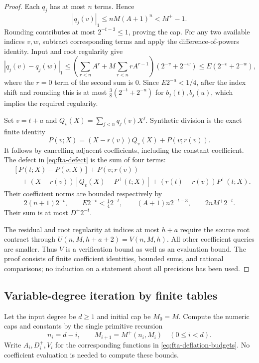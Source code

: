 \begin{proof}
Each $q_j$ has at most $n$ terms.  Hence
\[
 |q_j(v)|_1\le nM(A+1)^n<M^+-1.
\]
Rounding contributes at most $2^{-t-3}\le1$, proving the cap.
For any two available indices $v,w$, subtract corresponding terms and
apply the difference-of-powers identity.  Input and root regularity give
\[
 |q_j(v)-q_j(w)|_1
 \le\left(\sum_{r<n} A^r+M\sum_{r<n}rA^{r-1}\right)
       (2^{-v}+2^{-w})
 \le E(2^{-v}+2^{-w}),
\]
where the $r=0$ term of the second sum is $0$.
Since $E2^{-a}<1/4$, after the index shift and rounding this is at most
$\tfrac38(2^{-t}+2^{-u})$ for $b_j(t),b_j(u)$, which implies the
required regularity.

Set $v=t+a$ and $Q_v(X)=\sum_{j<n}q_j(v)X^j$.  Synthetic division is
the exact finite identity
\[
 P(v;X)=(X-r(v))Q_v(X)+P(v;r(v)).
\]
It follows by cancelling adjacent coefficients, including the constant
coefficient.  The defect in \eqref{eq:fta-defect} is the sum of four
terms:
\begin{align*}
 &[P(t;X)-P(v;X)] + P(v;r(v))\\
 &\quad +(X-r(v))[Q_v(X)-P^+(t;X)]
       +(r(t)-r(v))P^+(t;X).
\end{align*}
Their coefficient norms are bounded respectively by
\[
 2(n+1)2^{-t},\qquad
 E2^{-v}<\tfrac14 2^{-t},\qquad
 (A+1)n2^{-t-3},\qquad
 2nM^+2^{-t}.
\]
Their sum is at most $D^+2^{-t}$.

The residual and root regularity at indices at most $h+a$ require the
source root contract through $U(n,M,h+a+2)=V(n,M,h)$.  All other
coefficient queries are smaller.  Thus $V$ is a verification bound as
well as an evaluation bound.  The proof consists of finite coefficient
identities, bounded sums, and rational comparisons; no induction on a
statement about all precisions has been used.
\end{proof}

\subsection{Variable-degree iteration by finite tables}

Let the input degree be $d\ge1$ and initial cap be $M_0=M$.
Compute the numeric caps and constants by the single primitive recursion
\[
 n_i=d-i,\qquad
 M_{i+1}=M^+(n_i,M_i)\quad(0\le i<d).
 \tag{F13}\label{eq:fta-cap-recursion}
\]
Write $A_i,D_i^+,V_i$ for the corresponding functions in
\eqref{eq:fta-deflation-budgets}.  No coefficient evaluation is needed
to compute these bounds.


